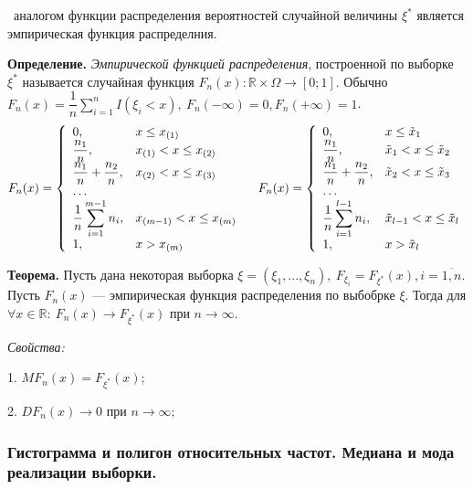 \documentclass[9pt]{article}
\begin{document}
\ 
 аналогом функции распределения вероятностей случайной величины \(\xi^*\) является эмпирическая функция распределния.
\par\textbf{Определение.} \textit{Эмпирической функцией распределения}, построенной по выборке \(\xi^*\) называется случайная функция \(F_n(x):\mathbb R\times\Omega\to[0;1]\). Обычно \(F_n(x)=\dfrac{1}{n}\displaystyle\sum_{i=1}^nI(\xi_i<x),\ F_n(-\infty)=0,F_n(+\infty)=1\).
\[F_n(x)=\left\{
\begin{array}{ll}
    0, & x\le x_{(1)} \\
    \dfrac{n_1}{n}, & x_{(1)}<x\le x_{(2)}\\
    \dfrac{n_1}{n}+\dfrac{n_2}{n}, & x_{(2)}<x\le x_{(3)}\\
    \hdots \\
    \dfrac{1}{n}\displaystyle\sum_{i=1}^{m-1}n_i, & x_{(m-1)}<x\le x_{(m)}\\
    1, & x>x_{(m)}
\end{array}
\right.\quad F_n(x)=\left\{
\begin{array}{ll}
    0, & x\le \Tilde{x}_{1} \\
    \dfrac{n_1}{n}, & \Tilde{x}_{1}<x\le \Tilde{x}_{2}\\
    \dfrac{n_1}{n}+\dfrac{n_2}{n}, & \Tilde{x}_{2}<x\le \Tilde{x}_{3}\\
    \hdots \\
    \dfrac{1}{n}\displaystyle\sum_{i=1}^{l-1}n_i, & \Tilde{x}_{l-1}<x\le \Tilde{x}_{l}\\
    1, & x>\Tilde{x}_{l}
\end{array}
\right.\]

\par\textbf{Теорема.} Пусть дана некоторая выборка \(\xi=(\xi_1,...,\xi_n),\ F_{\xi_i}=F_{\xi^*}(x),i=\overline{1,n}\). Пусть \(F_n(x)\) --- эмпирическая функция распределения по выбобрке \(\xi\). Тогда для \(\forall x\in\mathbb R:\ F_n(x)\to F_{\xi^*}(x)\) при \(n\to\infty\).
\par\textit{Свойства:}
\par1. \(MF_n(x)=F_{\xi^*}(x)\);
\par2. \(DF_n(x)\to0\) при \(n\to\infty\);

\subsubsection{Гистограмма и полигон относительных частот. Медиана и мода реализации выборки.}
\end{document}
